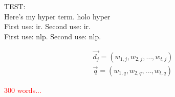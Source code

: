 TEST:\\
Here’s my \gls{hyper} term. \gls{holo} \gls{hyper}\\
First use: \gls{ir}. Second use: \gls{ir}.\\
First use: \gls{nlp}. Second use: \gls{nlp}.

\begin{align}
\vec{d_j} = \left(w_{1,j}, w_{2,j}, \ldots, w_{t,j} \right) \\
\vec{q} = \left(w_{1,q}, w_{2,q}, \ldots, w_{t,q} \right)
\end{align}

\textcolor{red}{300 words...}

\begin{comment}
\end{comment}

\begin{draft}
\end{draft}

\begin{shaded}
\end{shaded}


